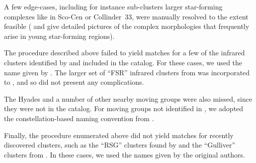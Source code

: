 \documentclass[12pt,twocolumn,tighten]{aastex62}
\begin{document}
A few edge-cases, including for instance sub-clusters  larger
star-forming complexes like in Sco-Cen or Collinder~33, were 
manually resolved to the extent feasible (\citealt{rizzuto_multidimensional_2011}
and \citealt{saurin_isolating_2015} give
detailed pictures of the complex morphologies that frequently arise in
young star-forming regions).

The procedure described above failed to yield matches for a few of the
infrared clusters identified by \citet{majaess_discovering_2013} and
included in the \citet{dias_proper_2014} catalog.
For these cases, we used the name given by \citet{dias_proper_2014}.
The larger set of ``FSR'' infrared clusters from
\citet{froebrich_FSR_2007} was incorporated to
\citet{Kharchenko_et_al_2013}, and so did not present any
complications.

The Hyades and a number of other nearby moving groups were also
missed, since they were not in the \citet{Kharchenko_et_al_2013}
catalog.  For moving groups not identified in
\citet{Kharchenko_et_al_2013}, we adopted the constellation-based
naming convention from \citet{gagne_banyan_XI_2018}.  

Finally, the procedure enumerated above did not yield matches for
recently discovered clusters, such as the ``RSG'' clusters found by
\citet{roser_nine_RSG_2016} and the ``Gulliver'' clusters from
\citet{cantat-gaudin_gaia_2018}.  In these cases, we used the names
given by the original authors.
\end{document}
